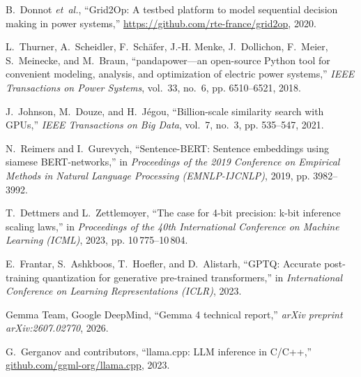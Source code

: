 B.~Donnot \emph{et~al.}, ``{Grid2Op}: A testbed platform to model sequential
  decision making in power systems,''
  \url{https://github.com/rte-france/grid2op}, 2020.

L.~Thurner, A.~Scheidler, F.~Sch{\"a}fer, J.-H. Menke, J.~Dollichon, F.~Meier,
  S.~Meinecke, and M.~Braun, ``pandapower---an open-source {Python} tool for
  convenient modeling, analysis, and optimization of electric power systems,''
  \emph{IEEE Transactions on Power Systems}, vol.~33, no.~6, pp. 6510--6521,
  2018.

J.~Johnson, M.~Douze, and H.~J{\'e}gou, ``Billion-scale similarity search with
  {GPUs},'' \emph{IEEE Transactions on Big Data}, vol.~7, no.~3, pp. 535--547,
  2021.

N.~Reimers and I.~Gurevych, ``Sentence-{BERT}: Sentence embeddings using
  siamese {BERT}-networks,'' in \emph{Proceedings of the 2019 Conference on
  Empirical Methods in Natural Language Processing (EMNLP-IJCNLP)}, 2019, pp.
  3982--3992.

T.~Dettmers and L.~Zettlemoyer, ``The case for 4-bit precision: k-bit inference
  scaling laws,'' in \emph{Proceedings of the 40th International Conference on
  Machine Learning (ICML)}, 2023, pp. 10\,775--10\,804.

E.~Frantar, S.~Ashkboos, T.~Hoefler, and D.~Alistarh, ``{GPTQ}: Accurate
  post-training quantization for generative pre-trained transformers,'' in
  \emph{International Conference on Learning Representations (ICLR)}, 2023.

{Gemma Team, Google DeepMind}, ``Gemma 4 technical report,'' \emph{arXiv
  preprint arXiv:2607.02770}, 2026.

G.~Gerganov and contributors, ``llama.cpp: {LLM} inference in {C/C++},''
  \url{github.com/ggml-org/llama.cpp}, 2023.
